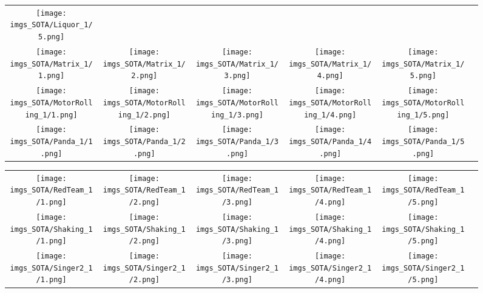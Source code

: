 \begin{figure}[H]
\begin{tabular}{@{}c@{}c@{}c@{}c@{}c@{}c@{}}
\texttt{[image: imgs\_SOTA/Liquor\_1/5.png]}&
\\
\texttt{[image: imgs\_SOTA/Matrix\_1/1.png]}&
\texttt{[image: imgs\_SOTA/Matrix\_1/2.png]}&
\texttt{[image: imgs\_SOTA/Matrix\_1/3.png]}&
\texttt{[image: imgs\_SOTA/Matrix\_1/4.png]}&
\texttt{[image: imgs\_SOTA/Matrix\_1/5.png]}&
\\
\texttt{[image: imgs\_SOTA/MotorRolling\_1/1.png]}&
\texttt{[image: imgs\_SOTA/MotorRolling\_1/2.png]}&
\texttt{[image: imgs\_SOTA/MotorRolling\_1/3.png]}&
\texttt{[image: imgs\_SOTA/MotorRolling\_1/4.png]}&
\texttt{[image: imgs\_SOTA/MotorRolling\_1/5.png]}&
\\
\texttt{[image: imgs\_SOTA/Panda\_1/1.png]}&
\texttt{[image: imgs\_SOTA/Panda\_1/2.png]}&
\texttt{[image: imgs\_SOTA/Panda\_1/3.png]}&
\texttt{[image: imgs\_SOTA/Panda\_1/4.png]}&
\texttt{[image: imgs\_SOTA/Panda\_1/5.png]}&
\\
\end{tabular}\end{figure}\begin{figure}[H]
\setlength{\tabcolsep}{6pt}
\renewcommand{\arraystretch}{0}
\begin{tabular}{@{}c@{}c@{}c@{}c@{}c@{}c@{}}\texttt{[image: imgs\_SOTA/RedTeam\_1/1.png]}&
\texttt{[image: imgs\_SOTA/RedTeam\_1/2.png]}&
\texttt{[image: imgs\_SOTA/RedTeam\_1/3.png]}&
\texttt{[image: imgs\_SOTA/RedTeam\_1/4.png]}&
\texttt{[image: imgs\_SOTA/RedTeam\_1/5.png]}&
\\
\texttt{[image: imgs\_SOTA/Shaking\_1/1.png]}&
\texttt{[image: imgs\_SOTA/Shaking\_1/2.png]}&
\texttt{[image: imgs\_SOTA/Shaking\_1/3.png]}&
\texttt{[image: imgs\_SOTA/Shaking\_1/4.png]}&
\texttt{[image: imgs\_SOTA/Shaking\_1/5.png]}&
\\
\texttt{[image: imgs\_SOTA/Singer2\_1/1.png]}&
\texttt{[image: imgs\_SOTA/Singer2\_1/2.png]}&
\texttt{[image: imgs\_SOTA/Singer2\_1/3.png]}&
\texttt{[image: imgs\_SOTA/Singer2\_1/4.png]}&
\texttt{[image: imgs\_SOTA/Singer2\_1/5.png]}&

\end{tabular}
\end{figure}
